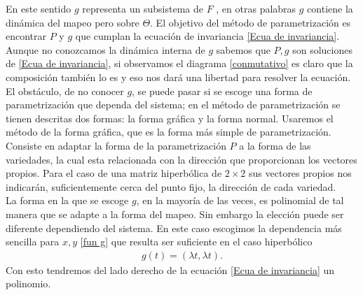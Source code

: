 En este sentido $g$ representa un subsistema de $F$ , en otras palabras $g$ contiene la dinámica del mapeo pero sobre $\Theta$. El objetivo del método de parametrización es encontrar $P$ y $g$ que cumplan la ecuación de invariancia \ref{Ecua de invariancia}. Aunque no conozcamos la dinámica interna de $g$ sabemos que $P,g$ son soluciones de \ref{Ecua de invariancia}, si observamos el diagrama \ref{conmutativo} es claro que la composición también lo es y eso nos dará una libertad para resolver la ecuación. El obstáculo, de no conocer $g$, se puede pasar si se escoge una forma de parametrización que dependa del sistema; en el método de parametrización se tienen descritas dos formas: la forma gráfica y la forma normal. Usaremos el método de la forma gráfica, que es la forma más simple de parametrización. Consiste en adaptar la forma de la parametrización $P$ a la forma de las variedades, la cual esta relacionada con la dirección que proporcionan los vectores propios. Para el caso de una matriz hiperbólica de $2\times 2$ sus vectores propios nos indicarán, suficientemente cerca del punto fijo, la dirección de cada variedad. \\


La forma en la que se escoge $g$, en la mayoría de las veces, es polinomial de tal manera que se adapte a la forma del mapeo. Sin embargo la elección puede ser diferente dependiendo del sistema. En este caso escogimos la dependencia más sencilla para $x,y$ \ref{fun g} que resulta ser suficiente en el caso hiperbólico
\begin{eqnarray}
g(t) = (\lambda t,\lambda t).
\label{fun g}
\end{eqnarray}
Con esto tendremos del lado derecho de la ecuación \ref{Ecua de invariancia} un polinomio. \\


